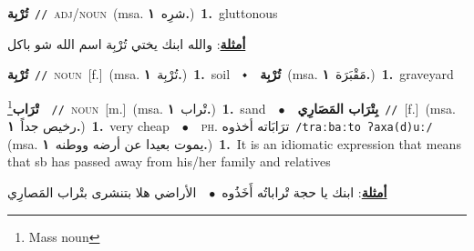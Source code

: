 \documentclass[10pt,a4paper,twoside]{article} %
\begin{document}
\begin{multicols}{2}
{\setlength\topsep{0pt}\textbf{\foreignlanguage{arabic}{تُرْبِة}}\ {\color{gray}\texttt{//}\color{black}}\ \textsc{adj/noun}\ \color{gray}(msa. \foreignlanguage{arabic}{شرِه}~\foreignlanguage{arabic}{\textbf{١.}})\color{black}\ \textbf{1.}~gluttonous\  \begin{flushright}\color{gray}\foreignlanguage{arabic}{\textbf{\underline{\foreignlanguage{arabic}{أمثلة}}}: والله ابنك يختي تُرْبِة اسم الله شو باكل}\end{flushright}\color{black}} \vspace{2mm}

{\setlength\topsep{0pt}\textbf{\foreignlanguage{arabic}{تُرْبِة}}\ {\color{gray}\texttt{//}\color{black}}\ \textsc{noun}\ [f.]\ \color{gray}(msa. \foreignlanguage{arabic}{تُرْبِة}~\foreignlanguage{arabic}{\textbf{١.}})\color{black}\ \textbf{1.}~soil\ \ $\smblkdiamond$\ \ \setlength\topsep{0pt}\textbf{\foreignlanguage{arabic}{تُرْبِة}}\ \color{gray}(msa. \foreignlanguage{arabic}{مَقْبَرَة}~\foreignlanguage{arabic}{\textbf{١.}})\color{black}\ \textbf{1.}~graveyard\ } \vspace{2mm}

{\setlength\topsep{0pt}\textbf{\foreignlanguage{arabic}{تْرَاب}}\footnote{Mass noun}\ \ {\color{gray}\texttt{//}\color{black}}\ \textsc{noun}\ [m.]\ \color{gray}(msa. \foreignlanguage{arabic}{تْراب}~\foreignlanguage{arabic}{\textbf{١.}})\color{black}\ \textbf{1.}~sand\ \ $\bullet$\ \ \setlength\topsep{0pt}\textbf{\foreignlanguage{arabic}{بِتْرَاب المَصَارِي}}\ {\color{gray}\texttt{//}\color{black}}\ [f.]\ \color{gray}(msa. \foreignlanguage{arabic}{رخيص جداً}~\foreignlanguage{arabic}{\textbf{١.}})\color{black}\ \textbf{1.}~very cheap\ \ $\bullet$\ \ \textsc{ph.} \color{gray} \foreignlanguage{arabic}{ترَابَاته أخذوه}\color{black}\ {\color{gray}\texttt{/{\sffamily traːbaːto ʔaxa(d)uː}/}\color{black}}\ \color{gray} (msa. \foreignlanguage{arabic}{يموت بعيدا عن أرضه ووطنه}~\foreignlanguage{arabic}{\textbf{١.}})\color{black}\ \textbf{1.}~It is an idiomatic expression that means that sb has passed away from his/her family and relatives\  \begin{flushright}\color{gray}\foreignlanguage{arabic}{\textbf{\underline{\foreignlanguage{arabic}{أمثلة}}}: ابنك يا حجة تْراباتُه أَخَذُوه\ $\bullet$\ \  الأراضي هلا بتنشرى بتْراب المَصارِي}\end{flushright}\color{black}} \vspace{2mm}


\end{multicols}
\end{document}
